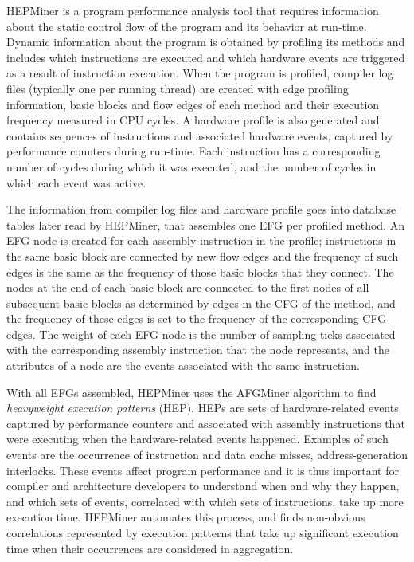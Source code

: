 HEPMiner is a program performance analysis tool that requires information about the static control flow of the program and its behavior at run-time. Dynamic information about the program is obtained by profiling its methods and includes which instructions are executed and which hardware events are triggered as a result of instruction execution. When the program is profiled, compiler log files (typically one per running thread) are created with edge profiling information, \ie basic blocks and flow edges of each method and their execution frequency measured in CPU cycles. A hardware profile is also generated and contains sequences of instructions and associated hardware events, captured by performance counters during run-time. Each instruction has a corresponding number of cycles during which it was executed, and the number of cycles in which each event was active. 

The information from compiler log files and hardware profile goes into database tables later read by HEPMiner, that assembles one EFG per profiled method. An EFG node is created for each assembly instruction in the profile; instructions in the same basic block are connected by new flow edges and the frequency of such edges is the same as the frequency of those basic blocks that they connect. The nodes at the end of each basic block are connected to the first nodes of all subsequent basic blocks as determined by edges in the CFG of the method, and the frequency of these edges is set to the frequency of the corresponding CFG edges. The weight of each EFG node is the number of sampling ticks associated with the corresponding assembly instruction that the node represents, and the attributes of a node are the events associated with the same instruction. 

With all EFGs assembled, HEPMiner uses the AFGMiner algorithm to find \emph{heavyweight execution patterns} (HEP). HEPs are sets of hardware-related events captured by performance counters and associated with assembly instructions that were executing when the hardware-related events happened. Examples of such events are the occurrence of instruction and data cache misses, address-generation interlocks. These events affect program performance and it is thus important for compiler and architecture developers to understand when and why they happen, and which sets of events, correlated with which sets of instructions, take up more execution time. HEPMiner automates this process, and finds non-obvious correlations represented by execution patterns that take up significant execution time when their occurrences are considered in aggregation.
